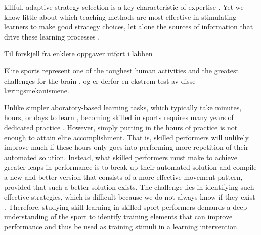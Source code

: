 killful, adaptive strategy selection is a key characteristic of expertise \cite{ericsson_scientific_1998, ericsson_development_2003, krakauer_motor_2019, stanley_motor_2013}. Yet we know little about which teaching methods are most effective in stimulating learners to make good strategy choices, let alone the sources of information that drive these learning processes \cite{taylor_cerebellar_2014, taylor_role_2012}.








Til forskjell fra enklere oppgaver utført i labben 


Elite sports represent one of the toughest human activities and the greatest challenges for the brain \cite{walsh_is_2014}, og er derfor en ekstrem test av disse læringsmekanismene. 




Unlike simpler aboratory-based learning tasks, which typically take minutes, hours, or days to learn \cite{du_relationship_2022, yarrow_inside_2009}, becoming skilled in sports requires many years of dedicated practice \cite{hodges_predicting_2004, vaeyens_talent_2009}.  However, simply putting in the hours of practice is not enough to attain elite accomplishment. That is, skilled performers will unlikely improve much if these hours only goes into performing more repetition of their automated solution\cite{ericsson_development_2003, ericsson_role_1993, ericsson_scientific_1998, ericsson_expert_1994, du_relationship_2022}. Instead, what skilled performers must make to achieve greater leaps in performance is to break up their automated solution and compile a new and better version that consists of a more effective movement pattern, provided that such a better solution exists\cite{du_relationship_2022}. The challenge lies in identifying such effective strategies, which is difficult because we do not always know if they exist \cite{gray_plateaus_2017, cohen_effect_2021}. Therefore, studying skill learning in skilled sport performers demands a deep understanding of the sport to identify training elements that can improve performance and thus be used as training stimuli in a learning intervention. 
